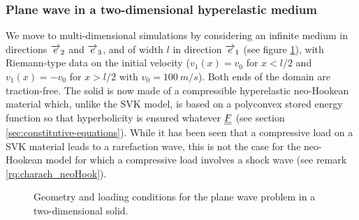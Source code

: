 

\subsubsection*{Plane wave in a two-dimensional hyperelastic medium}
We move to multi-dimensional simulations by considering an infinite medium in directions ${\overrightarrow{e}}_2$ and ${\overrightarrow{e}}_3$, and of width $l$ in direction ${\overrightarrow{e}}_1$ (see figure \ref{fig:2dHEbar}), with Riemann-type data on the initial velocity ($v_1(x)=v_0$ for $x <l/2$ and $v_1(x)=-v_0$ for $x >l/2$ with $v_0=100 \: m/s$). Both ends of the domain are traction-free.
The solid is now made of a compressible hyperelastic neo-Hookean material which, unlike the SVK model, is based on a polyconvex stored energy function so that hyperbolicity is ensured whatever ${\underline{\underline{F}}}$ (see section \ref{sec:constitutive-equations}).
While it has been seen that a compressive load on a SVK material leads to a rarefaction wave, this is not the case for the neo-Hookean model for which a compressive load involves a shock wave (see remark \ref{rq:charach_neoHook}).
\begin{figure}[h!]
  \centering
  
  \caption{Geometry and loading conditions for the plane wave problem in a two-dimensional solid.}
  \label{fig:2dHEbar}
\end{figure}

